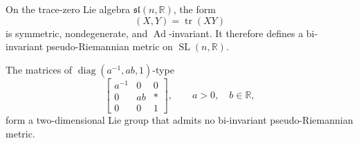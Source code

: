 \begin{remark}
  \label{rem:pet-ch1-ex-28}
  \leanok
  On the trace-zero Lie algebra $\mathfrak{sl}(n,\mathbb{R})$, the form
  \[
    (X,Y)=\operatorname{tr}(XY)
  \]
  is symmetric, nondegenerate, and $\operatorname{Ad}$-invariant. It therefore
  defines a bi-invariant pseudo-Riemannian metric on
  $\operatorname{SL}(n,\mathbb{R})$.
\end{remark}

\begin{remark}
  \label{rem:pet-ch1-ex-29}
  \leanok
  The matrices of $\operatorname{diag}(a^{-1},ab,1)$-type
  \[
    \left[\begin{smallmatrix}
      a^{-1}&0&0\\0&ab&\ast\\0&0&1
    \end{smallmatrix}\right],
    \qquad a>0,\quad b\in\mathbb{R},
  \]
  form a two-dimensional Lie group that admits no bi-invariant
  pseudo-Riemannian metric.
\end{remark}
